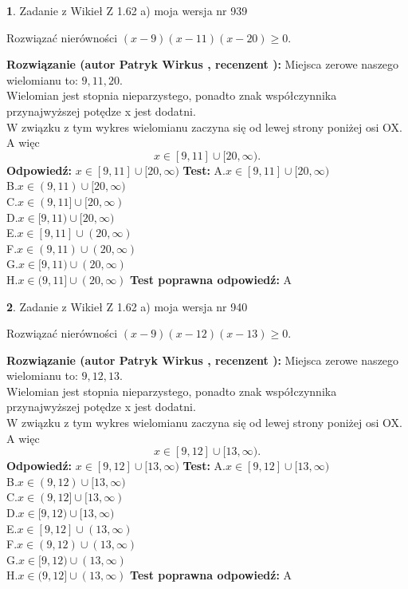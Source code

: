 \documentclass[12pt, a4paper]{article}
\theoremstyle{definition} %
\newtheorem{zad}{}
\newcommand{\zadStart}[1]{\begin{zad}#1\newline}
\newcommand{\zadStop}{\end{zad}}
\newcommand{\rozwStart}[2]{\noindent \textbf{Rozwiązanie (autor #1 , recenzent #2): }\newline}
\newcommand{\rozwStop}{\newline}
\newcommand{\odpStart}{\noindent \textbf{Odpowiedź:}\newline}
\newcommand{\odpStop}{\newline}
\newcommand{\testStart}{\noindent \textbf{Test:}\newline}
\newcommand{\testStop}{\newline}
\newcommand{\kluczStart}{\noindent \textbf{Test poprawna odpowiedź:}\newline}
\newcommand{\kluczStop}{\newline}
\begin{document}
\zadStart{Zadanie z Wikieł Z 1.62 a) moja wersja nr 939}

Rozwiązać nierówności $(x-9)(x-11)(x-20)\ge0$.
\zadStop
\rozwStart{Patryk Wirkus}{}
Miejsca zerowe naszego wielomianu to: $9, 11, 20$.\\
Wielomian jest stopnia nieparzystego, ponadto znak współczynnika przy\linebreak najwyższej potędze x jest dodatni.\\ W związku z tym wykres wielomianu zaczyna się od lewej strony poniżej osi OX. A więc $$x \in [9,11] \cup [20,\infty).$$
\rozwStop
\odpStart
$x \in [9,11] \cup [20,\infty)$
\odpStop
\testStart
A.$x \in [9,11] \cup [20,\infty)$\\
B.$x \in (9,11) \cup [20,\infty)$\\
C.$x \in (9,11] \cup [20,\infty)$\\
D.$x \in [9,11) \cup [20,\infty)$\\
E.$x \in [9,11] \cup (20,\infty)$\\
F.$x \in (9,11) \cup (20,\infty)$\\
G.$x \in [9,11) \cup (20,\infty)$\\
H.$x \in (9,11] \cup (20,\infty)$
\testStop
\kluczStart
A
\kluczStop



\zadStart{Zadanie z Wikieł Z 1.62 a) moja wersja nr 940}

Rozwiązać nierówności $(x-9)(x-12)(x-13)\ge0$.
\zadStop
\rozwStart{Patryk Wirkus}{}
Miejsca zerowe naszego wielomianu to: $9, 12, 13$.\\
Wielomian jest stopnia nieparzystego, ponadto znak współczynnika przy\linebreak najwyższej potędze x jest dodatni.\\ W związku z tym wykres wielomianu zaczyna się od lewej strony poniżej osi OX. A więc $$x \in [9,12] \cup [13,\infty).$$
\rozwStop
\odpStart
$x \in [9,12] \cup [13,\infty)$
\odpStop
\testStart
A.$x \in [9,12] \cup [13,\infty)$\\
B.$x \in (9,12) \cup [13,\infty)$\\
C.$x \in (9,12] \cup [13,\infty)$\\
D.$x \in [9,12) \cup [13,\infty)$\\
E.$x \in [9,12] \cup (13,\infty)$\\
F.$x \in (9,12) \cup (13,\infty)$\\
G.$x \in [9,12) \cup (13,\infty)$\\
H.$x \in (9,12] \cup (13,\infty)$
\testStop
\kluczStart
A
\kluczStop
\end{document}
